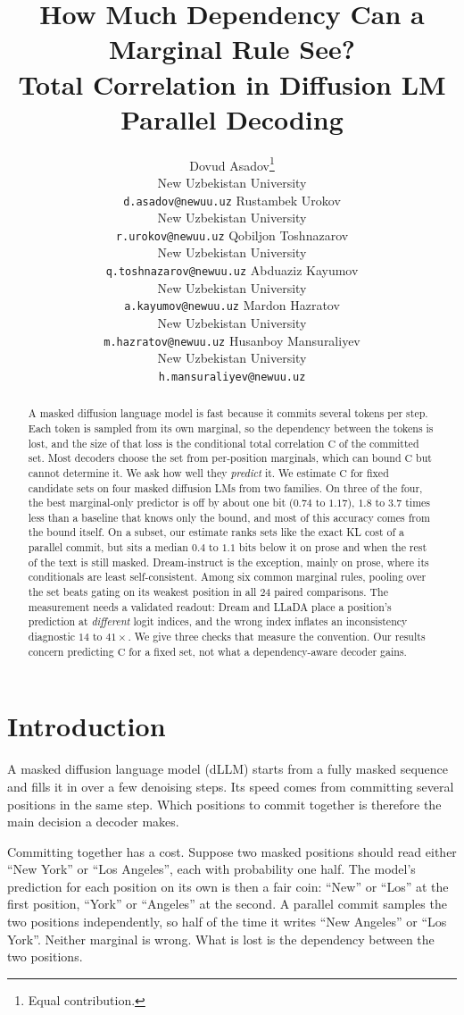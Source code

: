 \documentclass{article}
\title{How Much Dependency Can a Marginal Rule See?\\
Total Correlation in Diffusion LM Parallel Decoding}
\author{%
  Dovud Asadov\thanks{Equal contribution.}\\
  New Uzbekistan University\\
  \texttt{d.asadov@newuu.uz}
  \And
  Rustambek Urokov\footnotemark[1]\\
  New Uzbekistan University\\
  \texttt{r.urokov@newuu.uz}
  \And
  Qobiljon Toshnazarov\\
  New Uzbekistan University\\
  \texttt{q.toshnazarov@newuu.uz}
  \AND
  Abduaziz Kayumov\\
  New Uzbekistan University\\
  \texttt{a.kayumov@newuu.uz}
  \And
  Mardon Hazratov\\
  New Uzbekistan University\\
  \texttt{m.hazratov@newuu.uz}
  \And
  Husanboy Mansuraliyev\\
  New Uzbekistan University\\
  \texttt{h.mansuraliyev@newuu.uz}
}
\newcommand{\C}{\mathrm{C}}
\begin{document}
\maketitle

\begin{abstract}
A masked diffusion language model is fast because it commits several tokens per step.
Each token is sampled from its own marginal, so the dependency between the tokens is
lost, and the size of that loss is the conditional total correlation $\C$ of the
committed set. Most decoders choose the set from per-position marginals, which can bound
$\C$ but cannot determine it. We ask how well they \emph{predict} it. We estimate $\C$
for fixed candidate sets on four masked diffusion LMs from two families. On three of the
four, the best marginal-only predictor is off by about one bit ($0.74$ to $1.17$), $1.8$
to $3.7$ times less than a baseline that knows only the bound, and most of this accuracy
comes from the bound itself. On a subset, our estimate ranks sets like the exact KL cost
of a parallel commit, but sits a median $0.4$ to $1.1$ bits below it on prose and when
the rest of the text is still masked. Dream-instruct is the exception, mainly on prose,
where its conditionals are least self-consistent. Among six common marginal rules,
pooling over the set beats gating on its weakest position in all $24$ paired
comparisons. The measurement needs a validated readout: Dream and LLaDA place a
position's prediction at \emph{different} logit indices, and the wrong index inflates an
inconsistency diagnostic $14$ to $41\times$. We give three checks that measure the
convention. Our results concern predicting $\C$ for a fixed set, not what a
dependency-aware decoder gains.
\end{abstract}

\section{Introduction}
\label{sec:intro}

A masked diffusion language model (dLLM) \cite{llada,dream} starts from a fully masked
sequence and fills it in over a few denoising steps. Its speed comes from committing
several positions in the same step. Which positions to commit together is therefore the
main decision a decoder makes.

Committing together has a cost. Suppose two masked positions should read either
``New York'' or ``Los Angeles'', each with probability one half. The model's prediction
for each position on its own is then a fair coin: ``New'' or ``Los'' at the first
position, ``York'' or ``Angeles'' at the second. A parallel commit samples the two
positions independently, so half of the time it writes ``New Angeles'' or ``Los York''.
Neither marginal is wrong. What is lost is the dependency between the two positions.
\end{document}
